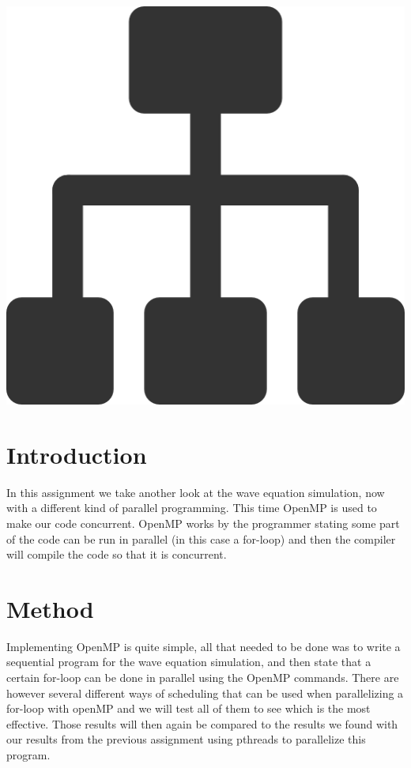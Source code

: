 \documentclass[a4paper,12px]{article}
\begin{document}
\vspace{2cm}
\begin{center}
    \includegraphics[width=(\textwidth/5*3)]{parallel_tasks}
\end{center}
\clearpage

\tableofcontents
\vspace{5mm}


\section{Introduction}

In this assignment we take another look at the wave equation simulation, now
with a different kind of parallel programming. This time OpenMP is used to make
our code concurrent. OpenMP works by the programmer stating some part of the
code can be run in parallel (in this case a for-loop) and then the compiler will
compile the code so that it is concurrent.

\section{Method}

Implementing OpenMP is quite simple, all that needed to be done was to write a
sequential program for the wave equation simulation, and then state that a
certain for-loop can be done in parallel using the OpenMP commands. There are
however several different ways of scheduling that can be used when parallelizing
a for-loop with openMP and we will test all of them to see which is the most
effective. Those results will then again be compared to the results we found
with our results from the previous assignment using pthreads to parallelize this
program.
\end{document}
